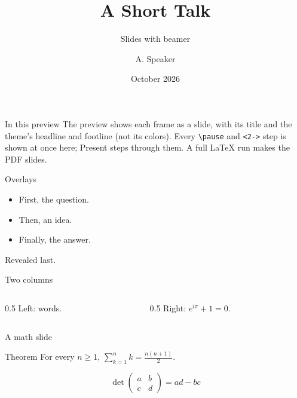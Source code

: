 \documentclass{beamer}
\title{A Short Talk}
\subtitle{Slides with beamer}
\author{A. Speaker}
\date{October 2026}
\begin{document}
\begin{frame}
  \titlepage
\end{frame}

\begin{frame}{In this preview}
  The preview shows each frame as a slide, with its title and the theme's headline and footline (not its
  colors). Every \texttt{\textbackslash pause} and \texttt{<2->} step is shown at once here; Present
  steps through them. A full LaTeX run makes the PDF slides.
\end{frame}

\begin{frame}{Overlays}
  \begin{itemize}
    \item<1-> First, the question.
    \item<2-> Then, an idea.
    \item<3-> Finally, the answer.
  \end{itemize}
  \pause
  Revealed last.
\end{frame}

\begin{frame}{Two columns}
  \begin{columns}
    \begin{column}{0.5\textwidth}
      Left: words.
    \end{column}
    \begin{column}{0.5\textwidth}
      Right: $e^{i\pi} + 1 = 0$.
    \end{column}
  \end{columns}
\end{frame}

\begin{frame}{A math slide}
  \begin{block}{Theorem}
    For every $n \ge 1$, $\displaystyle \sum_{k=1}^{n} k = \frac{n(n+1)}{2}$.
  \end{block}
  \[ \det\begin{pmatrix} a & b \\ c & d \end{pmatrix} = ad - bc \]
\end{frame}
\end{document}
